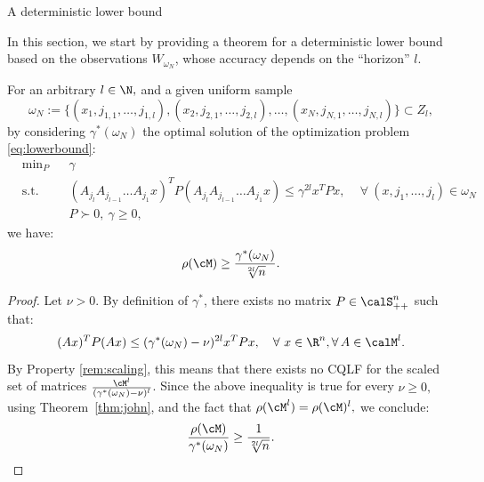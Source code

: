 \begin{subsection}{A deterministic lower bound}

In this section, we start by providing a theorem for a deterministic lower bound based on the observations $W_{\omega_N}$, whose accuracy depends on the ``horizon'' $l$.
\begin{theorem}\label{thm:lowerbound}
For an arbitrary $l \in \N,$ and a given uniform sample $$\omega_N := \{(x_1, j_{1,1},\dots,j_{1,l}), (x_2, j_{2,1},\dots,j_{2,l}), \ldots, (x_N, j_{N,1},\dots,j_{N,l})\} \subset Z_l,$$ 
by considering $\gamma^*(\omega_N)$ the optimal solution of the optimization problem \eqref{eq:lowerbound}:
\begin{equation*}
\begin{aligned}
& \text{min}_P & & \gamma \\
& \text{s.t.} 
&  & (A_{j_l} A_{j_{l-1}} \dots A_{j_1} x)^T P (A_{j_l} A_{j_{l-1}} \dots A_{j_1} x) \leq \gamma^{2l} x^T P x, \,  \quad \forall\ (x, j_1,\dots, j_l) \in \omega_N\\
& && P \succ 0,\ \gamma \geq 0,
\end{aligned}
\end{equation*}
we have:
$$\rho(\cM) \geq \frac{\gamma^*(\omega_N)}{\sqrt[2l]{n}}.$$ 
\end{theorem}
\begin{proof}
Let $\nu >0$. By definition of $\gamma^*$,  there exists no matrix $P \in \calS^n_{++}$ such that:
\begin{equation*}
(Ax)^T P (Ax) \leq (\gamma^*(\omega_N) -\nu)^{2l} x^T P x,\quad \forall\ x \in \R^n, \forall\, A \in \calM^{l}.
\end{equation*}
By Property \ref{rem:scaling}, this means that there exists no CQLF for the scaled set of matrices $\frac{\cM^l}{(\gamma^*(\omega_N)-\nu)^l}$. Since the above inequality is true for every $\nu \geq 0,$ using Theorem~\ref{thm:john}, and the fact that $\rho(\cM^l)=\rho(\cM)^l,$ we conclude:
\begin{equation*}
\frac{\rho(\cM)}{\gamma^*(\omega_N)} \geq \frac{1}{\sqrt[2l]{n}}.
\end{equation*}
\end{proof}
\end{subsection}

